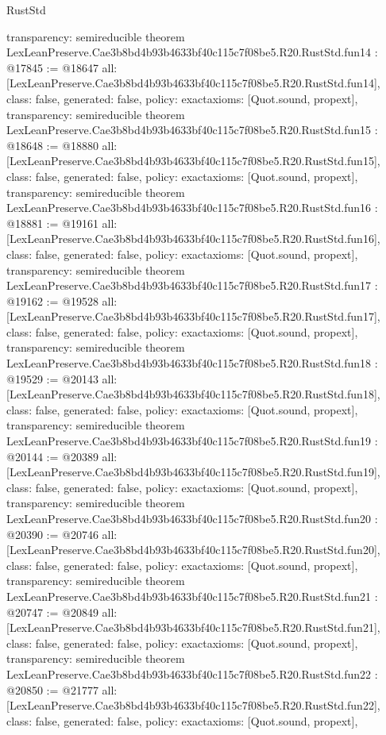 \begin{lexlean}{RustStd}
\begin{coremodule}
{  transparency: semireducible
}
theorem LexLeanPreserve.Cae3b8bd4b93b4633bf40c115c7f08be5.R20.RustStd.fun14 : @17845 := @18647 {
  all: [LexLeanPreserve.Cae3b8bd4b93b4633bf40c115c7f08be5.R20.RustStd.fun14],
  class: false,
  generated: false,
  policy: exact{axioms: [Quot.sound, propext]},
  transparency: semireducible
}
theorem LexLeanPreserve.Cae3b8bd4b93b4633bf40c115c7f08be5.R20.RustStd.fun15 : @18648 := @18880 {
  all: [LexLeanPreserve.Cae3b8bd4b93b4633bf40c115c7f08be5.R20.RustStd.fun15],
  class: false,
  generated: false,
  policy: exact{axioms: [Quot.sound, propext]},
  transparency: semireducible
}
theorem LexLeanPreserve.Cae3b8bd4b93b4633bf40c115c7f08be5.R20.RustStd.fun16 : @18881 := @19161 {
  all: [LexLeanPreserve.Cae3b8bd4b93b4633bf40c115c7f08be5.R20.RustStd.fun16],
  class: false,
  generated: false,
  policy: exact{axioms: [Quot.sound, propext]},
  transparency: semireducible
}
theorem LexLeanPreserve.Cae3b8bd4b93b4633bf40c115c7f08be5.R20.RustStd.fun17 : @19162 := @19528 {
  all: [LexLeanPreserve.Cae3b8bd4b93b4633bf40c115c7f08be5.R20.RustStd.fun17],
  class: false,
  generated: false,
  policy: exact{axioms: [Quot.sound, propext]},
  transparency: semireducible
}
theorem LexLeanPreserve.Cae3b8bd4b93b4633bf40c115c7f08be5.R20.RustStd.fun18 : @19529 := @20143 {
  all: [LexLeanPreserve.Cae3b8bd4b93b4633bf40c115c7f08be5.R20.RustStd.fun18],
  class: false,
  generated: false,
  policy: exact{axioms: [Quot.sound, propext]},
  transparency: semireducible
}
theorem LexLeanPreserve.Cae3b8bd4b93b4633bf40c115c7f08be5.R20.RustStd.fun19 : @20144 := @20389 {
  all: [LexLeanPreserve.Cae3b8bd4b93b4633bf40c115c7f08be5.R20.RustStd.fun19],
  class: false,
  generated: false,
  policy: exact{axioms: [Quot.sound, propext]},
  transparency: semireducible
}
theorem LexLeanPreserve.Cae3b8bd4b93b4633bf40c115c7f08be5.R20.RustStd.fun20 : @20390 := @20746 {
  all: [LexLeanPreserve.Cae3b8bd4b93b4633bf40c115c7f08be5.R20.RustStd.fun20],
  class: false,
  generated: false,
  policy: exact{axioms: [Quot.sound, propext]},
  transparency: semireducible
}
theorem LexLeanPreserve.Cae3b8bd4b93b4633bf40c115c7f08be5.R20.RustStd.fun21 : @20747 := @20849 {
  all: [LexLeanPreserve.Cae3b8bd4b93b4633bf40c115c7f08be5.R20.RustStd.fun21],
  class: false,
  generated: false,
  policy: exact{axioms: [Quot.sound, propext]},
  transparency: semireducible
}
theorem LexLeanPreserve.Cae3b8bd4b93b4633bf40c115c7f08be5.R20.RustStd.fun22 : @20850 := @21777 {
  all: [LexLeanPreserve.Cae3b8bd4b93b4633bf40c115c7f08be5.R20.RustStd.fun22],
  class: false,
  generated: false,
  policy: exact{axioms: [Quot.sound, propext]},
}
\end{coremodule}
\end{lexlean}
